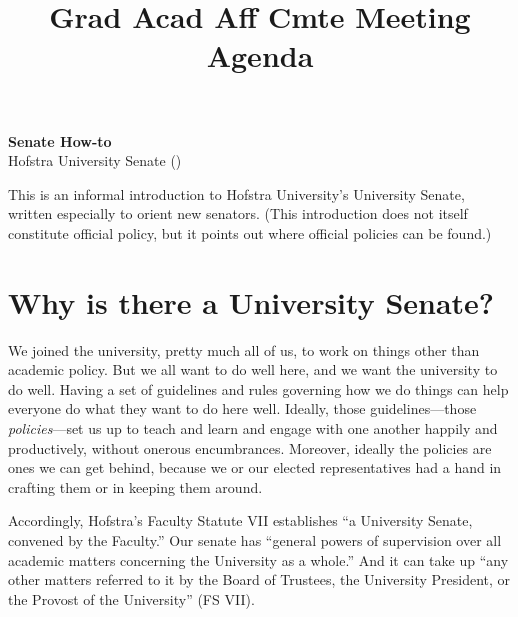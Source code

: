 \documentclass[12pt]{article}
\title{Grad Acad Aff Cmte Meeting Agenda \DTMusedate{meetingdate}}
\begin{document}
\thispagestyle{empty}



\begin{center}
  \textbf{\large Senate How-to} \\ Hofstra University Senate (\the\year) 
\end{center}



\noident This is an informal introduction to Hofstra University's University
Senate, written especially to orient new senators. (This introduction
does not itself constitute official policy, but it points out where
official policies can be found.)



\begin{center}
\begin{minipage}[c]{4.25in} %
\tableofcontents
\end{minipage}
\end{center}



\section{Why is there a University
Senate?}\label{why-is-there-a-university-senate}

We joined the university, pretty much all of us, to work on things other
than academic policy. But we all want to do well here, and we want the
university to do well. Having a set of guidelines and rules governing
how we do things can help everyone do what they want to do here well.
Ideally, those guidelines---those \emph{policies}---set us up to teach
and learn and engage with one another happily and productively, without
onerous encumbrances. Moreover, ideally the policies are ones we can get
behind, because we or our elected representatives had a hand in crafting
them or in keeping them around.

Accordingly, Hofstra's Faculty Statute VII establishes ``a University
Senate, convened by the Faculty.'' Our senate has ``general powers of
supervision over all academic matters concerning the University as a
whole.'' And it can take up ``any other matters referred to it by the
Board of Trustees, the University President, or the Provost of the
University'' (FS VII).
\end{document}
